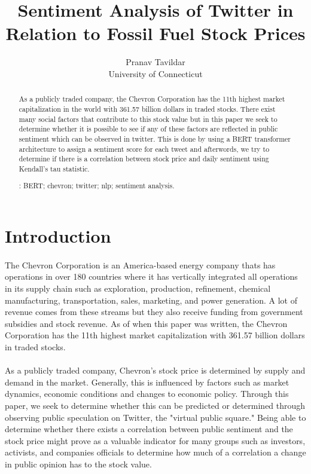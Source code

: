 \documentclass[12pt, letterpaper, titlepage]{article}
\title{Sentiment Analysis of Twitter in Relation to Fossil Fuel Stock Prices}
\author{Pranav Tavildar\\
  University of Connecticut
}
\begin{document}
\maketitle
\doublespace

\begin{abstract}
As a publicly traded company, the Chevron Corporation has the 11th highest market capitalization in the world with 361.57 billion dollars in traded stocks. There exist many social factors that contribute to this stock value but in this paper we seek to determine whether it is possible to see if any of these factors are reflected in public sentiment which can be observed in twitter.  This is done by using a BERT transformer architecture to assign a sentiment score for each tweet and afterwords, we try to determine if there is a correlation between stock price and daily sentiment using Kendall's tau statistic.

\bigskip
{}:
BERT;
chevron;
twitter;
nlp;
sentiment analysis.

\end{abstract}

\section{Introduction}
\label{sec: intro}
\paragraph{}
	The Chevron Corporation is an America-based energy company thats has operations in over 180 countries where it has vertically integrated all operations in its supply chain such as exploration, production, refinement, chemical manufacturing, transportation, sales, marketing, and power generation. A lot of revenue comes from these streams but they also receive funding from government subsidies and stock revenue. As of when this paper was written, the Chevron Corporation has the 11th highest market capitalization with 361.57 billion dollars in traded stocks.
	\paragraph{}
	As a publicly traded company, Chevron's stock price is determined by supply and demand in the market. Generally, this is influenced by factors such as market dynamics, economic conditions and changes to economic policy. Through this paper, we seek to determine whether this can be predicted or determined through observing public speculation on Twitter, the "virtual public square." Being able to determine whether there exists a correlation between public sentiment and the stock price might prove as a valuable indicator for many groups such as investors, activists, and companies officials to determine how much of a correlation a change in public opinion has to the stock value.  	
\end{document}
